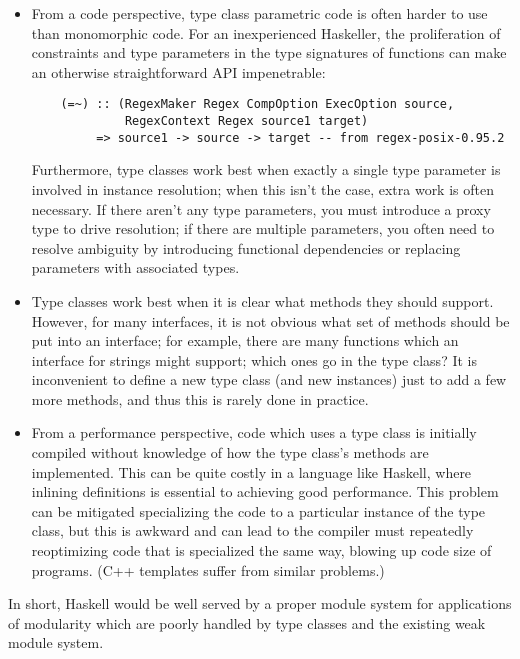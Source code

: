 \begin{itemize}
    \item From a code perspective, type class parametric code is often
    harder to use than monomorphic code.  For an inexperienced
    Haskeller, the proliferation of constraints and type parameters in the
    type signatures of functions can make an otherwise straightforward
    API impenetrable:
    \begin{lstlisting}
    (=~) :: (RegexMaker Regex CompOption ExecOption source,
             RegexContext Regex source1 target)
         => source1 -> source -> target -- from regex-posix-0.95.2
    \end{lstlisting}
    Furthermore, type classes work best when exactly a single type
    parameter is involved in instance resolution; when this isn't the
    case, extra work is often necessary. If there aren't any type
    parameters, you must introduce a proxy type to drive resolution; if
    there are multiple parameters, you often need to resolve ambiguity
    by introducing functional dependencies or replacing parameters with
    associated types.

    \item Type classes work best when it is clear what methods they
    should support.  However, for many interfaces, it is not obvious
    what set of methods should be put into an interface; for example,
    there are many functions which an interface for strings might
    support; which ones go in the type class?  It is inconvenient
    to define a new type class (and new instances) just to add a
    few more methods, and thus this is rarely done in practice.

    \item From a performance perspective, code which uses a type class
    is initially compiled without knowledge of how the type class's
    methods are implemented.  This can be quite costly in a language
    like Haskell, where inlining definitions is essential to achieving
    good performance.  This problem can be mitigated specializing
    the code to a particular instance of the type class, but this
    is awkward and can lead to the compiler must repeatedly reoptimizing
    code that is specialized the same way, blowing up code size of
    programs. (C++ templates suffer from similar problems.)
\end{itemize}
%
In short, Haskell would be well served by a proper module system for
applications of modularity which are poorly handled by type
classes and the existing weak module system.

